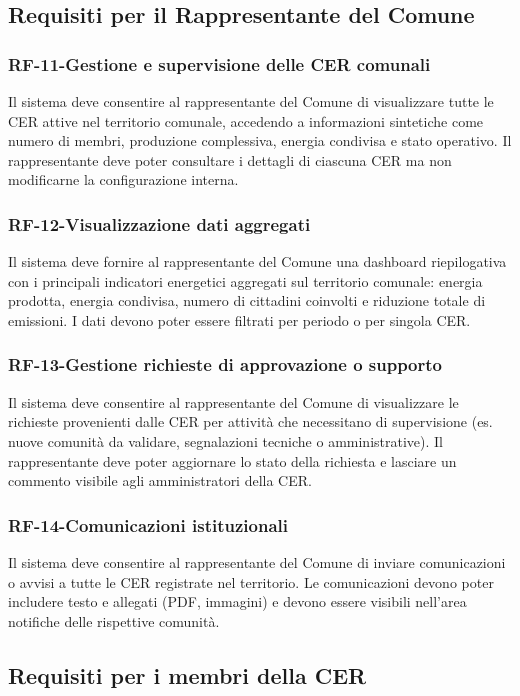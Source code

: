 \subsection{Requisiti per il Rappresentante del Comune}
\subsubsection*{RF-11-Gestione e supervisione delle CER comunali}
Il sistema deve consentire al rappresentante del Comune di visualizzare tutte le CER attive nel territorio comunale, accedendo a informazioni sintetiche come numero di membri, produzione complessiva, energia condivisa e stato operativo. Il rappresentante deve poter consultare i dettagli di ciascuna CER ma non modificarne la configurazione interna.
\subsubsection*{RF-12-Visualizzazione dati aggregati}
Il sistema deve fornire al rappresentante del Comune una dashboard riepilogativa con i principali indicatori energetici aggregati sul territorio comunale: energia prodotta, energia condivisa, numero di cittadini coinvolti e riduzione totale di emissioni. I dati devono poter essere filtrati per periodo o per singola CER.
\subsubsection*{RF-13-Gestione richieste di approvazione o supporto}
Il sistema deve consentire al rappresentante del Comune di visualizzare le richieste provenienti dalle CER per attività che necessitano di supervisione (es. nuove comunità da validare, segnalazioni tecniche o amministrative). Il rappresentante deve poter aggiornare lo stato della richiesta e lasciare un commento visibile agli amministratori della CER.
\subsubsection*{RF-14-Comunicazioni istituzionali}
Il sistema deve consentire al rappresentante del Comune di inviare comunicazioni o avvisi a tutte le CER registrate nel territorio. Le comunicazioni devono poter includere testo e allegati (PDF, immagini) e devono essere visibili nell’area notifiche delle rispettive comunità.
\subsection{Requisiti per i membri della CER}
